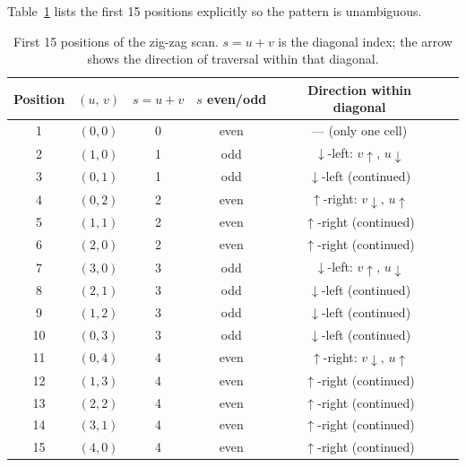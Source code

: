 \noindent Table~\ref{tab:zigzag} lists the first 15 positions explicitly so the pattern is unambiguous.

\begin{table}[H]
\centering
\caption{First 15 positions of the zig-zag scan. $s = u+v$ is the diagonal index; the arrow shows the direction of traversal within that diagonal.}
\label{tab:zigzag}
\setlength{\tabcolsep}{7pt}
\begin{tabular}{cccccc}
\toprule
Position & $(u,\,v)$ & $s = u+v$ & $s$ even/odd & Direction within diagonal \\
\midrule
1  & $(0,0)$ & 0 & even & — (only one cell) \\
2  & $(1,0)$ & 1 & odd  & $\downarrow$-left: $v{\uparrow},\,u{\downarrow}$ \\
3  & $(0,1)$ & 1 & odd  & $\downarrow$-left (continued) \\
4  & $(0,2)$ & 2 & even & $\uparrow$-right: $v{\downarrow},\,u{\uparrow}$ \\
5  & $(1,1)$ & 2 & even & $\uparrow$-right (continued) \\
6  & $(2,0)$ & 2 & even & $\uparrow$-right (continued) \\
7  & $(3,0)$ & 3 & odd  & $\downarrow$-left: $v{\uparrow},\,u{\downarrow}$ \\
8  & $(2,1)$ & 3 & odd  & $\downarrow$-left (continued) \\
9  & $(1,2)$ & 3 & odd  & $\downarrow$-left (continued) \\
10 & $(0,3)$ & 3 & odd  & $\downarrow$-left (continued) \\
11 & $(0,4)$ & 4 & even & $\uparrow$-right: $v{\downarrow},\,u{\uparrow}$ \\
12 & $(1,3)$ & 4 & even & $\uparrow$-right (continued) \\
13 & $(2,2)$ & 4 & even & $\uparrow$-right (continued) \\
14 & $(3,1)$ & 4 & even & $\uparrow$-right (continued) \\
15 & $(4,0)$ & 4 & even & $\uparrow$-right (continued) \\
\bottomrule
\end{tabular}
\end{table}

